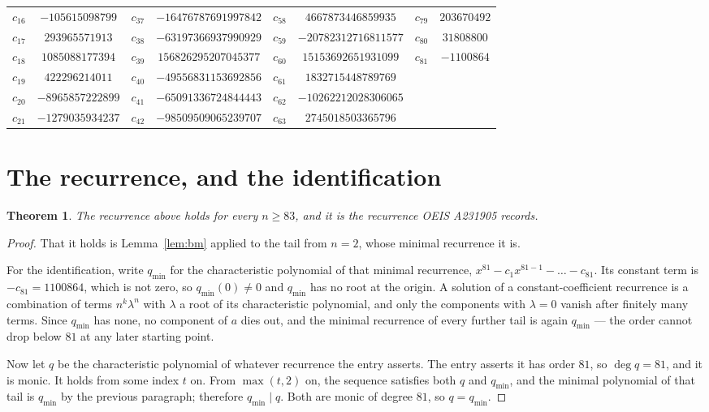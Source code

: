 \documentclass[11pt,a4paper]{article}
\theoremstyle{plain}
\newtheorem{theorem}{Theorem}
\theoremstyle{definition}
\begin{document}
\begin{center}
\begin{tabular}{cccccccc}
$c_{16}$ & $-105615098799$ & $c_{37}$ & $-16476787691997842$ & $c_{58}$ & $4667873446859935$ & $c_{79}$ & $203670492$ \\
$c_{17}$ & $293965571913$ & $c_{38}$ & $-63197366937990929$ & $c_{59}$ & $-20782312716811577$ & $c_{80}$ & $31808800$ \\
$c_{18}$ & $1085088177394$ & $c_{39}$ & $156826295207045377$ & $c_{60}$ & $15153692651931099$ & $c_{81}$ & $-1100864$ \\
$c_{19}$ & $422296214011$ & $c_{40}$ & $-49556831153692856$ & $c_{61}$ & $1832715448789769$ &  &  \\
$c_{20}$ & $-8965857222899$ & $c_{41}$ & $-65091336724844443$ & $c_{62}$ & $-10262212028306065$ &  &  \\
$c_{21}$ & $-1279035934237$ & $c_{42}$ & $-98509509065239707$ & $c_{63}$ & $2745018503365796$ &  &  \\
\end{tabular}
\end{center}

\section{The recurrence, and the identification}

\begin{theorem}
The recurrence above holds for every $n\ge83$, and it is the recurrence OEIS A231905 records.
\end{theorem}

\begin{proof}
That it holds is Lemma~\ref{lem:bm} applied to the tail from $n=2$, whose minimal
recurrence it is.

For the identification, write $q_{\min}$ for the characteristic polynomial of that minimal
recurrence, $x^{81}-c_1x^{81-1}-\dots-c_{81}$. Its constant term is
$-c_{81}=1100864$, which is not zero, so $q_{\min}(0)\neq0$ and $q_{\min}$ has no
root at the origin. A solution of a constant-coefficient recurrence is a combination of terms
$n^{k}\lambda^{n}$ with $\lambda$ a root of its characteristic polynomial, and only the
components with $\lambda=0$ vanish after finitely many terms. Since $q_{\min}$ has none, no
component of $a$ dies out, and the minimal recurrence of every further tail is again
$q_{\min}$ --- the order cannot drop below $81$ at any later starting point.

Now let $q$ be the characteristic polynomial of whatever recurrence the entry asserts. The
entry asserts it has order $81$, so $\deg q=81$, and it is monic. It holds from some
index $t$ on. From $\max(t,2)$ on, the sequence satisfies both $q$ and $q_{\min}$, and
the minimal polynomial of that tail is $q_{\min}$ by the previous paragraph; therefore
$q_{\min}\mid q$. Both are monic of degree $81$, so $q=q_{\min}$.
\end{proof}
\end{document}
